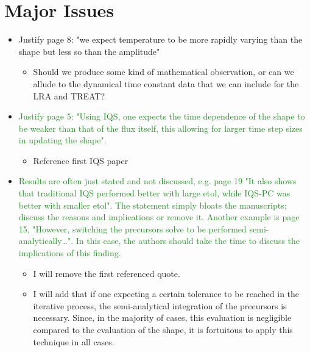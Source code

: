 \documentclass{elsarticle}
\newcommand{\fix}{\textsquare}
\newcommand{\easy}[1]{\textcolor{ForestGreen}{#1}}
\newcommand{\medm}[1]{\textcolor{BurntOrange}{#1}}
\begin{document}
\section*{Major Issues}

\begin{itemize}

\item[\fix] \medm{ Justify page 8: "we expect temperature to be more rapidly varying than the shape but less so than the amplitude" }
\begin{itemize}
\item Should we produce some kind of mathematical observation, or can we allude to the dynamical time constant data that we can include for the LRA and TREAT?
\end{itemize}

\item[\fix] \easy{ Justify page 5: "Using IQS, one expects the time dependence of the shape to be weaker than that of the flux itself, this allowing for larger time step sizes in updating the shape". }
\begin{itemize}
\item Reference first IQS paper
\end{itemize}

\item[\fix] \easy{  Results are often just stated and not discussed, e.g. page 19 "It also shows that traditional IQS performed better with large etol, while IQS-PC was better with smaller etol". The statement simply bloats the manuscripts; discuss the reasons and implications or remove it. Another example is page 15, "However, switching the precursors solve to be performed semi-analytically…".  In this case, the authors should take the time to discuss the implications of this finding. }
\begin{itemize}
\item I will remove the first referenced quote.
\item I will add that if one expecting a certain tolerance to be reached in the iterative process, the semi-analytical integration of the precursors is necessary. Since, in the majority of cases, this evaluation is negligible compared to the evaluation of the shape, it is fortuitous to apply this technique in all cases.
\end{itemize}


\end{itemize}
\end{document}
